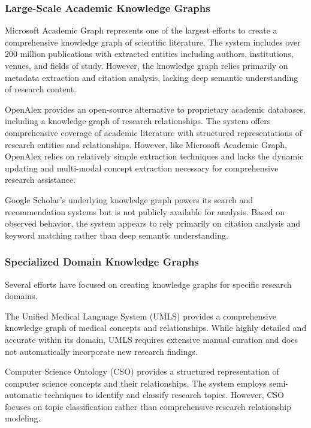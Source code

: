 \documentclass[10pt,twocolumn]{article}
\begin{document}
\subsubsection{Large-Scale Academic Knowledge Graphs}

Microsoft Academic Graph \cite{sinha2015overview} represents one of the largest efforts to create a comprehensive knowledge graph of scientific literature. The system includes over 200 million publications with extracted entities including authors, institutions, venues, and fields of study. However, the knowledge graph relies primarily on metadata extraction and citation analysis, lacking deep semantic understanding of research content.

OpenAlex \cite{priem2022openalex} provides an open-source alternative to proprietary academic databases, including a knowledge graph of research relationships. The system offers comprehensive coverage of academic literature with structured representations of research entities and relationships. However, like Microsoft Academic Graph, OpenAlex relies on relatively simple extraction techniques and lacks the dynamic updating and multi-modal concept extraction necessary for comprehensive research assistance.

Google Scholar's underlying knowledge graph powers its search and recommendation systems but is not publicly available for analysis. Based on observed behavior, the system appears to rely primarily on citation analysis and keyword matching rather than deep semantic understanding.

\subsubsection{Specialized Domain Knowledge Graphs}

Several efforts have focused on creating knowledge graphs for specific research domains.

The Unified Medical Language System (UMLS) \cite{bodenreider2004unified} provides a comprehensive knowledge graph of medical concepts and relationships. While highly detailed and accurate within its domain, UMLS requires extensive manual curation and does not automatically incorporate new research findings.

Computer Science Ontology (CSO) \cite{salatino2018computer} provides a structured representation of computer science concepts and their relationships. The system employs semi-automatic techniques to identify and classify research topics. However, CSO focuses on topic classification rather than comprehensive research relationship modeling.
\end{document}
